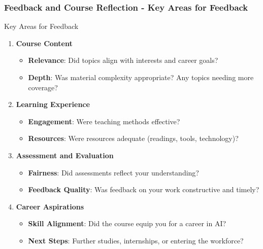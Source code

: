 \documentclass{beamer}
\begin{document}
\begin{frame}[fragile]
    \frametitle{Feedback and Course Reflection - Key Areas for Feedback}
    \begin{block}{Key Areas for Feedback}
        \begin{enumerate}
            \item \textbf{Course Content}
                \begin{itemize}
                    \item \textbf{Relevance}: Did topics align with interests and career goals?
                    \item \textbf{Depth}: Was material complexity appropriate? Any topics needing more coverage?
                \end{itemize}
            \item \textbf{Learning Experience}
                \begin{itemize}
                    \item \textbf{Engagement}: Were teaching methods effective?
                    \item \textbf{Resources}: Were resources adequate (readings, tools, technology)?
                \end{itemize}
            \item \textbf{Assessment and Evaluation}
                \begin{itemize}
                    \item \textbf{Fairness}: Did assessments reflect your understanding?
                    \item \textbf{Feedback Quality}: Was feedback on your work constructive and timely?
                \end{itemize}
            \item \textbf{Career Aspirations}
                \begin{itemize}
                    \item \textbf{Skill Alignment}: Did the course equip you for a career in AI?
                    \item \textbf{Next Steps}: Further studies, internships, or entering the workforce?
                \end{itemize}
        \end{enumerate}
    \end{block}
\end{frame}
\end{document}
